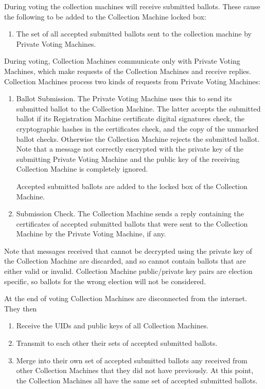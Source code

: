 \documentclass[12pt]{article}
\begin{document}
During voting the collection machines will
receive submitted ballots.  These cause the following to be
added to the Collection Machine locked box:

\begin{enumerate}
\setcounter{enumi}{\value{CML-COUNTER}}
\item The set of all accepted submitted ballots sent to the collection machine
by Private Voting Machines.
\setcounter{CML-COUNTER}{\value{enumi}}
\end{enumerate}


During voting, Collection Machines communicate only with
Private Voting Machines, which make requests of the Collection
Machines and receive replies.
Collection Machines process two kinds of requests from
Private Voting Machines:
\begin{enumerate}

\item
Ballot Submission.  The Private Voting Machine uses this to send
its submitted ballot to the Collection Machine.  The latter accepts
the submitted ballot if its Registration Machine certificate
digital signatures check, the cryptographic hashes in the certificates
check, and the copy of the unmarked ballot checks.
Otherwise the Collection Machine rejects the submitted
ballot.  Note that a message not correctly encrypted with
the private key of the submitting Private Voting Machine and the
public key of the receiving Collection Machine is completely ignored.

Accepted submitted ballots are added to the locked box of the
Collection Machine.

\item
Submission Check.  The Collection Machine sends a reply containing
the certificates of accepted submitted ballots
that were sent to the Collection Machine
by the Private Voting Machine, if any.

\end{enumerate}

Note that messages received that cannot be decrypted using the
private key of the Collection Machine
are discarded, and so cannot contain
ballots that are either valid or invalid.  Collection Machine
public/private key pairs are election specific, so ballots for
the wrong election will not be considered.

At the end of voting Collection Machines are disconnected from
the internet.  They then
\begin{enumerate}
\item Receive the UIDs and public keys of all Collection Machines.
\item Transmit to each other their sets of accepted submitted ballots.
\item Merge into their own set of accepted submitted ballots any
received from other Collection Machines that they did not have previously.
At this point, the Collection Machines all have the same set of accepted
submitted ballots.
\setcounter{CMC-COUNTER}{\value{enumi}}
\end{enumerate}
\end{document}

